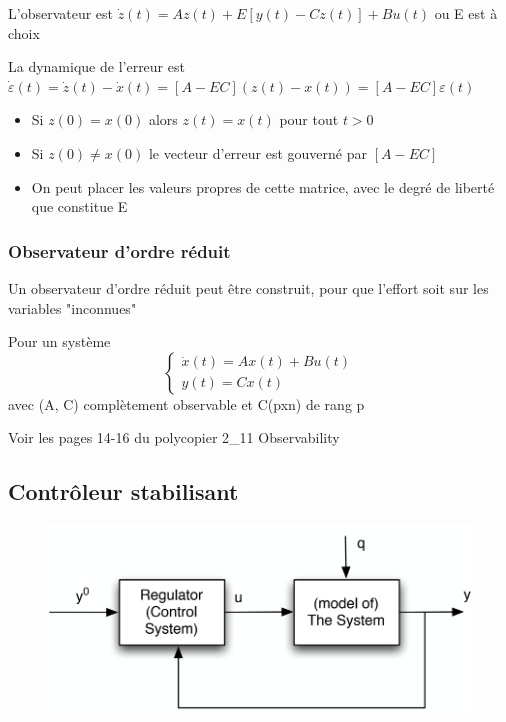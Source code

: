 \documentclass[resume]{subfiles}
\begin{document}
L'observateur est $\dot{z}(t)= Az(t)+E[y(t)-Cz(t)]+Bu(t)$ ou E est à choix

La dynamique de l'erreur est $\dot{\varepsilon}(t) = \dot{z}(t) - \dot{x}(t) = [A - EC] (z(t) - x(t)) = [A - EC] \varepsilon(t)$ 
\begin{itemize}
\item Si $z(0)=x(0)$ alors $z(t)=x(t)$ pour tout $t>0$ 
\item Si $z(0)\neq x(0)$ le vecteur d'erreur est gouverné par $[A-EC]$ 
\item On peut placer les valeurs propres de cette matrice, avec le degré de liberté que constitue E  
\end{itemize}

\subsubsection{Observateur d'ordre réduit}

Un observateur d’ordre réduit peut être construit, pour que l'effort soit sur les variables "inconnues"

  Pour un système \begin{equation}\begin{cases}\dot{x}(t)=Ax(t)+Bu(t)\\y(t)=Cx(t)\end{cases}\end{equation} avec (A, C) complètement observable et C(pxn) de rang p

Voir les pages 14-16 du polycopier 2\_11 Observability 

\subsection{Contrôleur stabilisant}

\begin{figure}[H]
    \centering
    \includegraphics[width=1\columnwidth]{Figures/CtrlStab_1.png}
\end{figure}
\end{document}
